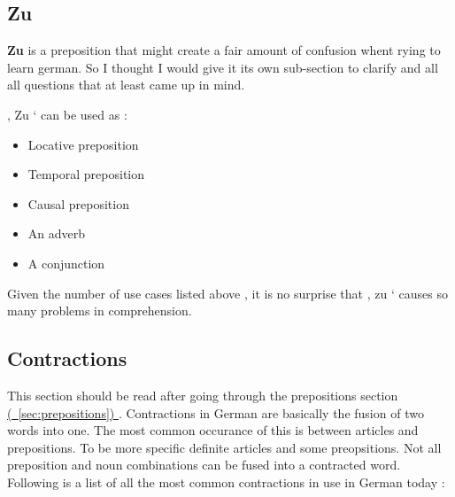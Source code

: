 \documentclass[a4paper,twocolumn,10pt]{article}
\newcommand{\newpar}
{\par \vspace{0.3cm}}
\newcommand{\subsectionend}
{
\nolinenumbers
\linenumbers
}
\newcommand{\refsec}[1]
{
	\hyperref[sec:#1]
	{
		(\textsection~\ref{sec:#1})
	}
}
\begin{document}
\subsectionend

\subsection{Zu}
\label{ssec:zu}

\textbf{Zu} is a preposition that might create a fair amount of confusion whent
rying to learn german. So I thought I would give it its own sub-section to
clarify and all all questions that at least came up in mind.\newpar

, Zu ` can be used as :\newpar


\begin{itemize}[noitemsep]
	\item Locative preposition 
	\item Temporal preposition 
	\item Causal preposition
	\item An adverb
	\item A conjunction
\end{itemize}


Given the number of use cases listed above , it is no surprise that , zu `
causes so many problems in comprehension.\newpar

\subsectionend

\subsection{Contractions}
\label{ssec:contractions}

This section should be read after going through the prepositions
section\refsec{prepositions}. Contractions in German are basically the fusion of
two words into one. The most common occurance of this is between articles and
prepositions. To be more specific definite articles and some preopsitions. Not
all preposition and noun combinations can be fused into a contracted word.
Following is a list of all the most common contractions in use in German today : 

\end{document}
